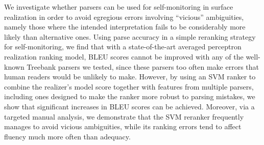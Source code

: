 We investigate whether parsers can be used for self-monitoring in surface realization in order to avoid egregious errors involving ``vicious'' ambiguities, namely those where the intended interpretation fails to be considerably more likely than alternative ones.  Using parse accuracy in a simple reranking strategy for self-monitoring, we find that with a state-of-the-art averaged perceptron realization ranking model, BLEU scores cannot be improved with any of the well-known Treebank parsers we tested, since these parsers too often make errors that human readers would be unlikely to make.  However, by using an SVM ranker to combine the realizer's model score together with features from multiple parsers, including ones designed to make the ranker more robust to parsing mistakes, we show that significant increases in BLEU scores can be achieved. Moreover, via a targeted manual analysis, we demonstrate that the SVM reranker frequently manages to avoid vicious ambiguities, while its ranking errors tend to affect fluency much more often than adequacy.
